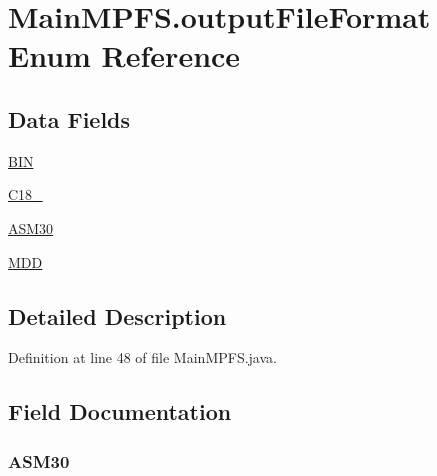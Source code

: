 \hypertarget{enum_microchip_m_p_f_s_1_1_main_m_p_f_s_1_1output_file_format}{}\section{Main\+M\+P\+F\+S.\+output\+File\+Format Enum Reference}
\label{enum_microchip_m_p_f_s_1_1_main_m_p_f_s_1_1output_file_format}
\subsection*{Data Fields}
\begin{DoxyCompactItemize}
\item 
\hyperlink{enum_microchip_m_p_f_s_1_1_main_m_p_f_s_1_1output_file_format_a4cdf0b70265066d6127339b05fd497c1}{B\+I\+N}
\item 
\hyperlink{enum_microchip_m_p_f_s_1_1_main_m_p_f_s_1_1output_file_format_af92ad03ebcc6a8347c29fee541e44b17}{C18\+\_}
\item 
\hyperlink{enum_microchip_m_p_f_s_1_1_main_m_p_f_s_1_1output_file_format_acb7365f33cd0e4fd80d250fb72ba39d5}{A\+S\+M30}
\item 
\hyperlink{enum_microchip_m_p_f_s_1_1_main_m_p_f_s_1_1output_file_format_a243d004bf4bcbc53e81b2d5fecfe17b8}{M\+D\+D}
\end{DoxyCompactItemize}


\subsection{Detailed Description}


Definition at line 48 of file Main\+M\+P\+F\+S.\+java.



\subsection{Field Documentation}
\hypertarget{enum_microchip_m_p_f_s_1_1_main_m_p_f_s_1_1output_file_format_acb7365f33cd0e4fd80d250fb72ba39d5}{}
\subsubsection[{A\+S\+M30}]{\setlength{\rightskip}{0pt plus 5cm}A\+S\+M30}\label{enum_microchip_m_p_f_s_1_1_main_m_p_f_s_1_1output_file_format_acb7365f33cd0e4fd80d250fb72ba39d5}



